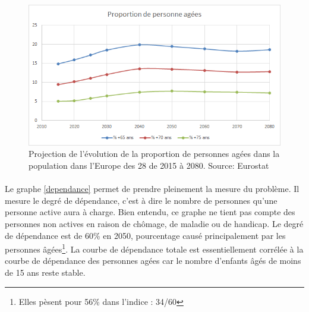 \begin{figure}[h!]
    \begin{center}
        \includegraphics[scale=0.7]{document/proj_prop.png}
        \caption{Projection de l'évolution de la proportion de personnes agées dans la population dans l'Europe des 28 de 2015 à 2080. Source: Eurostat~\citep{eurostat_europop13}}
        \label{proj_prop}
    \end{center}
\end{figure}

\paragraph{}Le graphe \ref{dependance} permet de prendre pleinement la mesure du problème. Il mesure le degré de dépendance, c'est à dire le nombre de personnes qu’une personne active aura à charge. Bien entendu, ce graphe ne tient pas compte des personnes non actives en raison de chômage, de maladie ou de handicap. Le degré de dépendance est de 60\% en 2050, pourcentage causé principalement par les personnes âgées\footnote{ Elles pèsent pour 56\% dans l’indice : 34/60}. La courbe de dépendance totale est essentiellement corrélée à la courbe de dépendance des personnes agées car le nombre d’enfants âgés de moins de 15 ans reste stable. 



